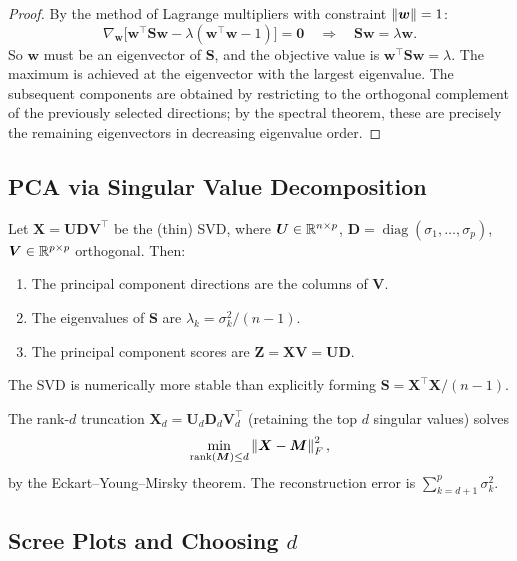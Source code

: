 \begin{proof}
By the method of Lagrange multipliers with constraint $\left\| \bm{w} \right\|=1$:
\[
  \nabla_{\bm{w}}\bigl[\bm{w}^\top\bm{S}\bm{w} - \lambda(\bm{w}^\top\bm{w}-1)\bigr] = \bm{0}
  \quad\Longrightarrow\quad \bm{S}\bm{w} = \lambda\bm{w}.
\]
So $\bm{w}$ must be an eigenvector of $\bm{S}$, and the objective value is $\bm{w}^\top\bm{S}\bm{w}=\lambda$. The maximum is achieved at the eigenvector with the largest eigenvalue. The subsequent components are obtained by restricting to the orthogonal complement of the previously selected directions; by the spectral theorem, these are precisely the remaining eigenvectors in decreasing eigenvalue order.
\end{proof}

\subsection{PCA via Singular Value Decomposition}

\begin{theorem}
Let $\bm{X}=\bm{U}\bm{D}\bm{V}^\top$ be the (thin) SVD, where $\bm{U}\in\mathbb{R}^{n\times p}$, $\bm{D}=\operatorname{diag}(\sigma_1,\dots,\sigma_p)$, $\bm{V}\in\mathbb{R}^{p\times p}$ orthogonal. Then:
\begin{enumerate}
  \item The principal component directions are the columns of $\bm{V}$.
  \item The eigenvalues of $\bm{S}$ are $\lambda_k = \sigma_k^2/(n-1)$.
  \item The principal component scores are $\bm{Z}=\bm{X}\bm{V}=\bm{U}\bm{D}$.
\end{enumerate}
The SVD is numerically more stable than explicitly forming $\bm{S}=\bm{X}^\top\bm{X}/(n-1)$.
\end{theorem}

\begin{proposition}
The rank-$d$ truncation $\bm{X}_d=\bm{U}_d\bm{D}_d\bm{V}_d^\top$ (retaining the top $d$ singular values) solves
\[
  \min_{\operatorname{rank}(\bm{M})\leq d}\left\| \bm{X}-\bm{M} \right\|_F^2,
\]
by the Eckart--Young--Mirsky theorem. The reconstruction error is $\sum_{k=d+1}^p\sigma_k^2$.
\end{proposition}

\subsection{Scree Plots and Choosing $d$}

